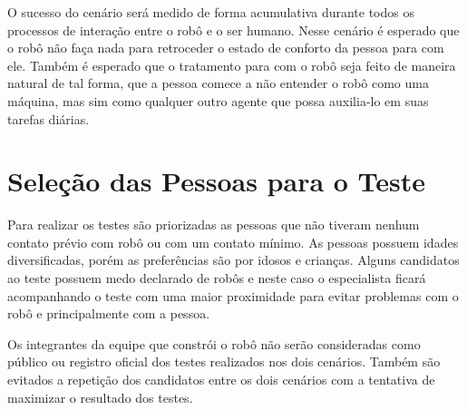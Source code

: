 O sucesso do cenário será medido de forma acumulativa durante todos os processos de interação entre o robô e o ser humano. Nesse cenário é esperado que o robô não faça nada para retroceder o estado de conforto da pessoa para com ele. Também é esperado que o tratamento para com o robô seja feito de maneira natural de tal forma, que a pessoa comece a não entender o robô como uma máquina, mas sim como qualquer outro agente que possa auxilia-lo em suas tarefas diárias.

\section{Seleção das Pessoas para o Teste}
\label{sec:perfistestes}
Para realizar os testes são priorizadas as pessoas que não tiveram nenhum contato prévio com robô ou com um contato mínimo. As pessoas possuem idades diversificadas, porém as preferências são por idosos e crianças. Alguns candidatos ao teste possuem medo declarado de robôs e neste caso o especialista ficará acompanhando o teste com uma maior proximidade para evitar problemas com o robô e principalmente com a pessoa.

Os integrantes da equipe que constrói o robô não serão consideradas como público ou registro oficial dos testes realizados nos dois cenários. Também são evitados a repetição dos candidatos entre os dois cenários com a tentativa de maximizar o resultado dos testes.

\section{}